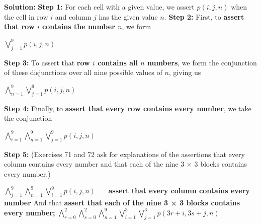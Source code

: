 \newpage
\begin{tcolorbox}[title=Example 2: Sudoku puzzles (2/2)]
\textbf{Solution:} \newline
\textbf{Step 1:} \newline
For each cell with a given value, we assert $p(i, j, n)$ when the cell in row $i$ and column $j$
has the given value $n$.
\newline \textbf{Step 2:} \newline
First, to \textbf{assert that row $i$ contains the number $n$}, we form
\begin{center}
$\bigvee_{j=1}^9 p(i,j,n)$    
\end{center}
\textbf{Step 3:}
\newline
To assert that\textbf{ row $i$ contains all $n$ numbers}, we form the conjunction of these disjunctions over all nine possible values of $n$, giving us
\begin{center}
$\bigwedge_{n=1}^9 \bigvee_{j=1}^9 p(i,j,n)$    
\end{center}
\textbf{Step 4:}
\newline
Finally, to \textbf{assert that every row contains  every number}, we take the conjunction
\begin{center}
$\bigwedge_{i=1}^9 \bigwedge_{n=1}^9 \bigvee_{j=1}^9 p(i,j,n)$    
\end{center}
\textbf{Step 5:}
\newline
(Exercises 71 and 72 ask for explanations of the assertions
that every column contains every number and that each of the nine 3 × 3 blocks contains
every number.)
\begin{center}
$\bigwedge_{j=1}^9 \bigwedge_{n=1}^9 \bigvee_{i=1}^9 p(i,j,n)$ \ \ \ \textbf{assert that every column contains every number}  \newline \newline
And that \textbf{assert that each of the nine 3 × 3 blocks contains every number;}
$\bigwedge_{r=0}^2 \bigwedge_{s=0}^2 \bigwedge_{n=1}^9 \bigvee_{i=1}^3 \bigvee_{j=1}^3 p(3r+i,3s+j,n)  $
\end{center}

\end{tcolorbox}




